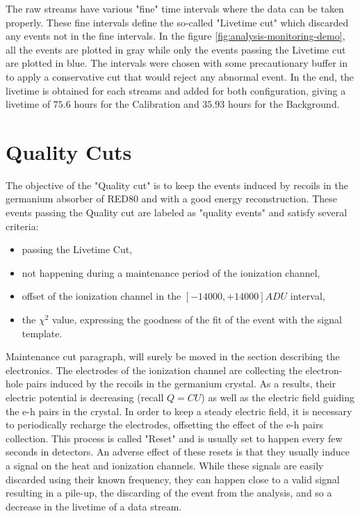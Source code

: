 The raw streams have various "fine" time intervals where the data can be taken properly. These fine intervals define the so-called "Livetime cut" which discarded any events not in the fine intervals. In the figure \ref{fig:analysis-monitoring-demo}, all the events are plotted in gray while only the events passing the Livetime cut are plotted in blue. The intervals were chosen with some precautionary buffer in to apply a conservative cut that would reject any abnormal event. In the end, the livetime is obtained for each streams and added for both configuration, giving a livetime of $75.6$ hours for the Calibration and $35.93$ hours for the Background.


\section{Quality Cuts}
\label{par:quality-cuts}

The objective of the "Quality cut" is to keep the events induced by recoils in the germanium absorber of RED80 and with a good energy reconstruction. These events  passing the Quality cut are labeled as "quality events" and satisfy several criteria:
\begin{itemize}
	\item passing the Livetime Cut,
	\item not happening during a maintenance period of the ionization channel,
	\item offset of the ionization channel in the $[-14000, +14000] ADU$ interval,
	\item the $\chi^2$ value, expressing the goodness of the fit of the event with the signal template.
\end{itemize}

{\color{red} Maintenance cut paragraph, will surely be moved in the section describing the electronics.}
\label{par:reset-maintenance}
The electrodes of the ionization channel are collecting the electron-hole pairs induced by the recoils in the germanium crystal. As a results, their electric potential is decreasing (recall $Q=CU$) as well as the electric field guiding the e-h pairs in the crystal. In order to keep a steady electric field, it is necessary to periodically recharge the electrodes, offsetting the effect of the e-h pairs collection. This process is called "Reset" and is usually set to happen every few seconds in detectors.
An adverse effect of these resets is that they usually induce a signal on the heat and ionization channels. While these signals are easily discarded using their known frequency, they can happen close to a valid signal resulting in a pile-up, the discarding of the event from the analysis, and so a decrease in the livetime of a data stream.

